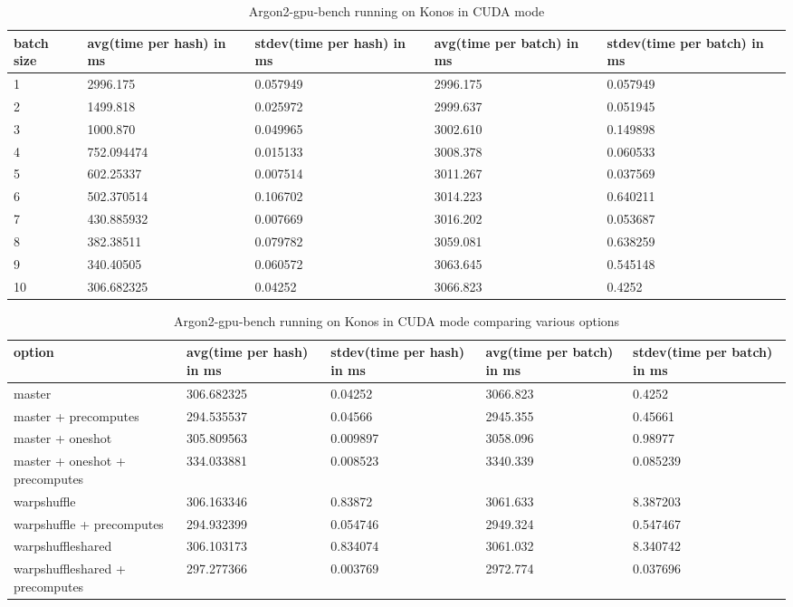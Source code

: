 \documentclass[nolof]{fithesis3}
\begin{document}
\noindent
\begin{table}
\caption{Argon2-gpu-bench running on Konos in CUDA mode}
\label{tab:konosgpu}
\begin{tabularx}{\textwidth}{| X | X | X | X | X |}
\hline
batch size & avg(time per hash) in ms & stdev(time per hash) in ms & avg(time per batch) in ms & stdev(time per batch) in ms\\
\hline
1 & 2996.175 & 0.057949 & 2996.175 & 0.057949\\
\hline
2 & 1499.818 & 0.025972 & 2999.637 & 0.051945 \\
\hline
3 & 1000.870 & 0.049965 & 3002.610 & 0.149898 \\
\hline
4 & 752.094474 & 0.015133 & 3008.378 & 0.060533 \\
\hline
5 & 602.25337 & 0.007514 & 3011.267 & 0.037569 \\
\hline
6 & 502.370514 & 0.106702 & 3014.223 & 0.640211 \\
\hline
7 & 430.885932 & 0.007669 & 3016.202 & 0.053687 \\
\hline
8 & 382.38511 & 0.079782 & 3059.081 & 0.638259 \\
\hline
9 & 340.40505 & 0.060572 & 3063.645 & 0.545148 \\
\hline
10 & 306.682325 & 0.04252 & 3066.823 & 0.4252 \\
\hline
\end{tabularx}
\end{table}


\noindent
\begin{table}
\caption{Argon2-gpu-bench running on Konos in CUDA mode comparing various options}
\label{tab:konosgpuopt}
\begin{tabularx}{\textwidth}{| X | X | X | X | X |}
\hline
option & avg(time per hash) in ms & stdev(time per hash) in ms & avg(time per batch) in ms & stdev(time per batch) in ms\\
\hline
master & 306.682325 & 0.04252 & 3066.823 & 0.4252 \\
\hline
master + precomputes & 294.535537 & 0.04566 & 2945.355 & 0.45661 \\
\hline
master + oneshot & 305.809563 & 0.009897 & 3058.096 & 0.98977 \\
\hline
master + oneshot + precomputes & 334.033881 & 0.008523 & 3340.339 & 0.085239 \\
\hline
warpshuffle & 306.163346 & 0.83872 & 3061.633 & 8.387203 \\
\hline
warpshuffle + precomputes & 294.932399 & 0.054746 & 2949.324 & 0.547467\\
\hline
warpshuffleshared & 306.103173 & 0.834074 & 3061.032 & 8.340742 \\
\hline
warpshuffleshared + precomputes & 297.277366 & 0.003769 & 2972.774 & 0.037696 \\
\hline
\end{tabularx}
\end{table}
\end{document}
